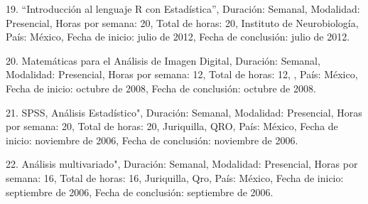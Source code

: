 19. “Introducción al lenguaje R con Estadística”, Duración: Semanal, Modalidad: Presencial, Horas 
por semana: 20, Total de horas: 20, Instituto de Neurobiología, País: México, Fecha de inicio: julio 
de 2012, Fecha de conclusión: julio de 2012.

20. Matemáticas para el Análisis de Imagen Digital, Duración: Semanal, Modalidad: Presencial, Horas 
por semana: 12, Total de horas: 12, , País: México, Fecha de inicio: octubre de 2008, Fecha de 
conclusión: octubre de 2008.

21. SPSS, Análisis Estadístico", Duración: Semanal, Modalidad: Presencial, Horas por semana: 20, 
Total de horas: 20, Juriquilla, QRO, País: México, Fecha de inicio: noviembre de 2006, Fecha de 
conclusión: noviembre de 2006.

22. Análisis multivariado", Duración: Semanal, Modalidad: Presencial, Horas por semana: 16, Total de 
horas: 16, Juriquilla, Qro, País: México, Fecha de inicio: septiembre de 2006, Fecha de conclusión: 
septiembre de 2006.


